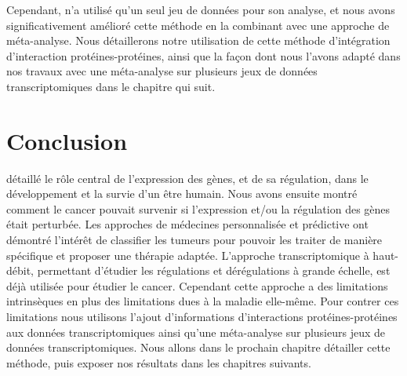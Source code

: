 			Cependant, \citeauthor{Chuang2007} n'a utilisé qu'un seul jeu de données pour son analyse, et nous avons significativement amélioré cette méthode en la combinant avec une approche de méta-analyse.
			Nous détaillerons notre utilisation de cette méthode d'intégration d'interaction protéines-protéines, ainsi que la façon dont nous l'avons adapté dans nos travaux avec une méta-analyse sur plusieurs jeux de données transcriptomiques dans le chapitre qui suit.


	\section{\textcolor{red!45!black}{Conclusion}}

		 détaillé le rôle central de l'expression des gènes, et de sa régulation, dans le développement et la survie d'un être humain.
		Nous avons ensuite montré comment le cancer pouvait survenir si l'expression et/ou la régulation des gènes était perturbée.
		Les approches de médecines personnalisée et prédictive ont démontré l'intérêt de classifier les tumeurs pour pouvoir les traiter de manière spécifique et proposer une thérapie adaptée.
		L'approche transcriptomique à haut-débit, permettant d'étudier les régulations et dérégulations à grande échelle, est déjà utilisée pour étudier le cancer.
		Cependant cette approche a des limitations intrinsèques en plus des limitations dues à la maladie elle-même.
		Pour contrer ces limitations nous utilisons l'ajout d'informations d'interactions protéines-protéines aux données transcriptomiques ainsi qu'une méta-analyse sur plusieurs jeux de données transcriptomiques.
		Nous allons dans le prochain chapitre détailler cette méthode, puis exposer nos résultats dans les chapitres suivants.